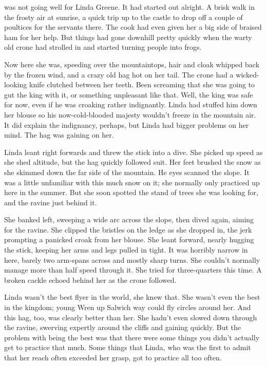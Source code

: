 
 was not going well for Linda Greene.
It had started out alright.
A brisk walk in the frosty air at sunrise, a quick trip up to the castle to drop off a couple of poultices for the servants there.
The cook had even given her a big side of braised ham for her help.
But things had gone downhill pretty quickly when the warty old crone had strolled in and started turning people into frogs.

Now here she was, speeding over the mountaintops, hair and cloak whipped back by the frozen wind, and a crazy old hag hot on her tail.
The crone had a wicked-looking knife clutched between her teeth.
Been screaming that she was going to gut the king with it, or something unpleasant like that.
Well, the king was safe for now, even if he was croaking rather indignantly.
Linda had stuffed him down her blouse so his now-cold-blooded majesty wouldn't freeze in the mountain air.
It did explain the indignancy, perhaps, but Linda had bigger problems on her mind.
The hag was gaining on her.

Linda leant right forwards and threw the stick into a dive.
She picked up speed as she shed altitude, but the hag quickly followed suit.
Her feet brushed the snow as she skimmed down the far side of the mountain.
He eyes scanned the slope.
It was a little unfamiliar with this much snow on it; she normally only practiced up here in the summer.
But she soon spotted the stand of trees she was looking for, and the ravine just behind it.

She banked left, sweeping a wide arc across the slope, then dived again, aiming for the ravine.
She clipped the bristles on the ledge as she dropped in, the jerk prompting a panicked croak from her blouse.
She leant forward, nearly hugging the stick, keeping her arms and legs pulled in tight.
It was horribly narrow in here, barely two arm-spans across and mostly sharp turns.
She couldn't normally manage more than half speed through it.
She tried for three-quarters this time.
A broken cackle echoed behind her as the crone followed.

Linda wasn't the best flyer in the world, she knew that.
She wasn't even the best in the kingdom; young Wren up Salwich way could fly circles around her.
And this hag, too, was clearly better than her.
She hadn't even slowed down through the ravine, swerving expertly around the cliffs and gaining quickly.
But the problem with being the best was that there were some things you didn't actually get to practice that much.
Some things that Linda, who was the first to admit that her reach often exceeded her grasp, got to practice all too often.


